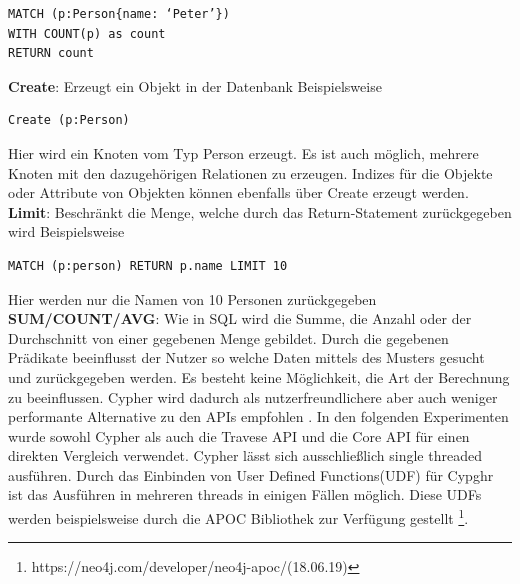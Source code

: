 \begin{Verbatim}[frame=single]
MATCH (p:Person{name: ‘Peter’})  
WITH COUNT(p) as count  
RETURN count
\end{Verbatim} 
\textbf{Create}: Erzeugt ein Objekt in der Datenbank Beispielsweise 
\begin{Verbatim}[frame=single]
Create (p:Person)
\end{Verbatim}
Hier wird ein Knoten vom Typ Person erzeugt. Es ist auch möglich, mehrere Knoten mit den dazugehörigen Relationen zu erzeugen. Indizes  für die Objekte oder Attribute von Objekten können ebenfalls über Create erzeugt werden.\newline
\textbf{Limit}: Beschränkt die Menge, welche durch das Return-Statement zurückgegeben wird Beispielsweise
\begin{Verbatim}[frame=single]
MATCH (p:person) RETURN p.name LIMIT 10
\end{Verbatim} 
Hier werden nur die Namen  von 10 Personen zurückgegeben\newline
\textbf{SUM/COUNT/AVG}: Wie in SQL wird die Summe, die Anzahl oder der Durchschnitt von einer gegebenen Menge gebildet. \newline \newline
Durch die gegebenen Prädikate beeinflusst der Nutzer so welche Daten mittels des Musters gesucht und zurückgegeben werden. Es besteht keine Möglichkeit, die Art der Berechnung zu beeinflussen. Cypher wird dadurch als nutzerfreundlichere aber auch weniger performante Alternative zu den APIs empfohlen \parencite{vukotic2015neo4j}. In den folgenden Experimenten wurde sowohl Cypher als auch die Travese API und die Core API für einen direkten Vergleich verwendet. Cypher lässt sich ausschließlich  single threaded ausführen. Durch das Einbinden von User Defined Functions(UDF) für Cypghr ist das Ausführen in mehreren threads in einigen Fällen möglich. Diese UDFs werden beispielsweise durch die APOC Bibliothek zur Verfügung gestellt \footnote{https://neo4j.com/developer/neo4j-apoc/(18.06.19)}.

